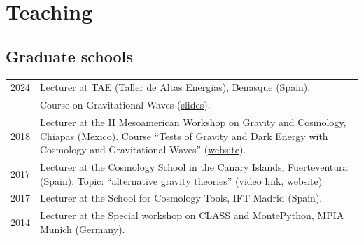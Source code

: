 \documentclass[11pt,a4paper]{article}
\begin{document}
\section*{Teaching}
\subsection*{Graduate schools}
 \vspace{-.3cm}
 \begin{longtable}{c p{14.5cm}}
  2024  & {Lecturer} at {TAE (Taller de Altas Energias)}, Benasque (Spain).
 \\ &
Course on Gravitational Waves (\href{https://www.benasque.org/2024tae/talks_contr/094_GW_Lectures_-_TAE_2024_-_Zumalacarregui_-_PDF.pdf}{slides}).
\\[2pt]
 2018  & {Lecturer} at the {II Mesoamerican Workshop on Gravity and Cosmology}, Chiapas (Mexico). 
Course ``Tests of Gravity and Dark Energy with Cosmology and Gravitational Waves''
 (\href{https://cescamilla4.wixsite.com/mctpcosmograv2}{website}).
\\[2pt]
2017  & {Lecturer} at the {Cosmology School in the Canary Islands}, Fuerteventura (Spain).  Topic: ``alternative gravity theories'' (\href{http://iactalks.iac.es/m/talks/view/1081}{\underline{video link}},
 \href{http://www.iac.es/congreso/cosmo2017/}{website}) \\[2pt]
2017  & {Lecturer} at the {School for Cosmology Tools}, IFT Madrid (Spain). 
\\[2pt] 
2014  & {Lecturer} at the {Special workshop on CLASS and MontePython}, MPIA Munich (Germany). %
\end{longtable}

\noindent
\end{document}
